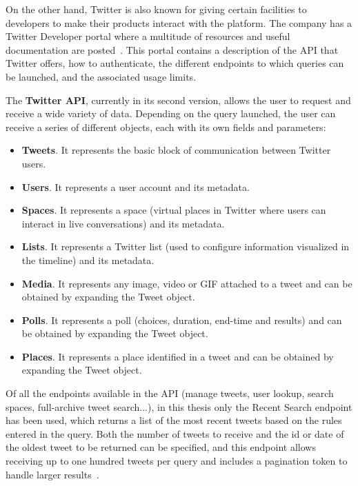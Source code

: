 \nonzeroparskip On the other hand, Twitter is also known for giving certain facilities to developers to make their products interact with the platform. The company has a Twitter Developer portal where a multitude of resources and useful documentation are posted~\cite{twitter_dev}. This portal contains a description of the API that Twitter offers, how to authenticate, the different endpoints to which queries can be launched, and the associated usage limits. 

\nonzeroparskip The \textbf{Twitter API}, currently in its second version, allows the user to request and receive a wide variety of data. Depending on the query launched, the user can receive a series of different objects, each with its own fields and parameters:
\begin{itemize}
	\item \textbf{Tweets}. It represents the basic block of communication between Twitter users.
	\item \textbf{Users}. It represents a user account and its metadata.
	\item \textbf{Spaces}. It represents a space (virtual places in Twitter where users can interact in live conversations) and its metadata.
	\item \textbf{Lists}. It represents a Twitter list (used to configure information visualized in the timeline) and its metadata.
	\item \textbf{Media}. It represents any image, video or GIF attached to a tweet and can be obtained by expanding the Tweet object.
	\item \textbf{Polls}. It represents a poll (choices, duration, end-time and results) and can be obtained by expanding the Tweet object.
	\item \textbf{Places}. It represents a place identified in a tweet and can be obtained by expanding the Tweet object.
\end{itemize}

\nonzeroparskip Of all the endpoints available in the API (manage tweets, user lookup, search spaces, full-archive tweet search...), in this thesis only the Recent Search endpoint has been used, which returns a list of the most recent tweets based on the rules entered in the query. Both the number of tweets to receive and the id or date of the oldest tweet to be returned can be specified, and this endpoint allows receiving up to one hundred tweets per query and includes a pagination token to handle larger results~\cite{twitter_dev_searchtweets}.

